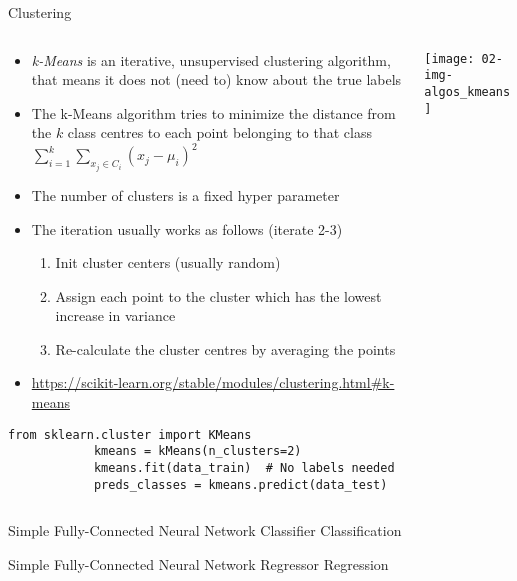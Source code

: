   \begin{frame}[fragile]{Clustering}
    \begin{columns}
      \begin{column}{0.65\textwidth}
        \begin{itemize}
          \item \emph{k-Means} is an iterative, unsupervised clustering algorithm, that means it does not (need to) know about the true labels
          \item The k-Means algorithm tries to minimize the distance from the $k$ class centres to each point belonging to that class $\sum_{i=1}^k \sum_{x_j\in C_i} (x_j - \mu_i)^2$
          \item The number of clusters is a fixed hyper parameter
          \item The iteration usually works as follows (iterate 2-3)
          \begin{enumerate}
            \item Init cluster centers (usually random)
            \item Assign each point to the cluster which has the lowest increase in variance
            \item Re-calculate the cluster centres by averaging the points
          \end{enumerate}
          \item \small\url{https://scikit-learn.org/stable/modules/clustering.html#k-means}
        \end{itemize}
        \vspace{-1em}
        \begin{mdframed}
          \begin{lstlisting}[style=dark, gobble=10, title=\lsttitlelight{Decision Tree regression [Note: example shortened]}]
            from sklearn.cluster import KMeans
            kmeans = kMeans(n_clusters=2)
            kmeans.fit(data_train)  # No labels needed
            preds_classes = kmeans.predict(data_test)
          \end{lstlisting}
        \end{mdframed}
      \end{column}
      \begin{column}{0.35\textwidth}
        \vspace{1em}

        \texttt{[image: 02-img-algos\_kmeans]}
      \end{column}
    \end{columns}
  \end{frame}

  \begin{frame}[fragile]{Simple Fully-Connected Neural Network Classifier}
  Classification
  \end{frame}

  \begin{frame}[fragile]{Simple Fully-Connected Neural Network Regressor}
  Regression
  \end{frame}




